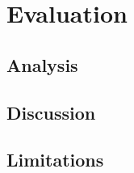 \chapter{Evaluation}
\label{ch:evaluation}

\section{Analysis}

\section{Discussion}

\section{Limitations}
